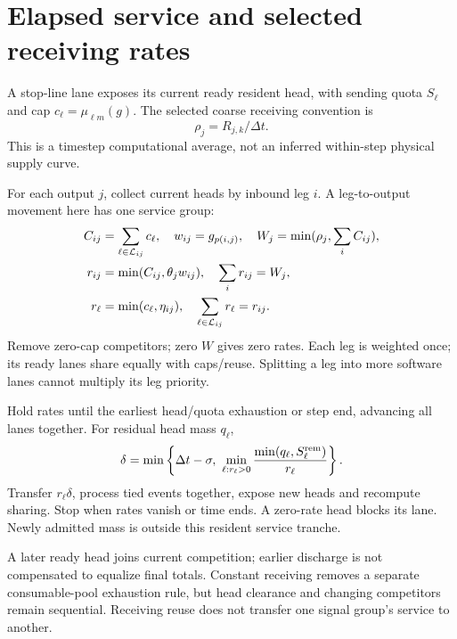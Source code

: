 \documentclass[10pt,a4paper]{article}
\begin{document}
\section{Elapsed service and selected receiving rates}

A stop-line lane exposes its current ready resident head, with sending
quota $S_\ell$ and cap $c_\ell=\mu_{\ell m}(g)$.
The selected coarse receiving convention is
\begin{equation}
 \rho_j=R_{j,k}/\Delta t .
 \label{eq:receiving-rate}
\end{equation}
This is a timestep computational average, not an inferred within-step
physical supply curve.

For each output $j$, collect current heads by inbound leg $i$.
A leg-to-output movement here has one service group:
\begin{align}
 C_{ij}&=\sum_{\ell\in{\cal L}_{ij}}c_\ell,\quad
 w_{ij}=g_{p(i,j)},\quad W_j=\min(\rho_j,\sum_iC_{ij}),\nonumber\\
 r_{ij}&=\min(C_{ij},\theta_jw_{ij}),\quad
                    \sum_i r_{ij}=W_j,\label{eq:leg-sharing}\\
 r_\ell&=\min(c_\ell,\eta_{ij}),\quad
                    \sum_{\ell\in{\cal L}_{ij}}r_\ell=r_{ij}.
 \label{eq:lane-sharing}
\end{align}
Remove zero-cap competitors; zero $W$ gives zero rates.
Each leg is weighted once; its ready lanes share equally with caps/reuse.
Splitting a leg into more software lanes cannot multiply its leg priority.

Hold rates until the earliest head/quota exhaustion or step end,
advancing all lanes together. For residual head mass $q_\ell$,
\begin{equation}
 \delta=\min\left\{\Delta t-\sigma,\
 \min_{\ell:r_\ell>0}
       \frac{\min(q_\ell,S_\ell^{\rm rem})}{r_\ell}\right\}.
 \label{eq:head-time}
\end{equation}
Transfer $r_\ell\delta$, process tied events together, expose new heads
and recompute sharing. Stop when rates vanish or time ends.
A zero-rate head blocks its lane. Newly admitted mass is outside this
resident service tranche.

A later ready head joins current competition; earlier discharge is not
compensated to equalize final totals. Constant receiving removes a
separate consumable-pool exhaustion rule, but head clearance and changing
competitors remain sequential. Receiving reuse does not transfer one
signal group's service to another.
\end{document}
